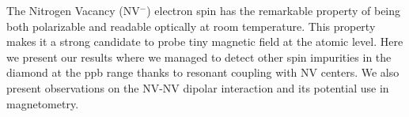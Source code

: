 \documentclass[aps]{revtex4-1}
\begin{document}
The Nitrogen Vacancy (NV$^-$) electron spin has the remarkable property of being both polarizable and readable optically at room temperature. This property makes it a strong candidate to probe tiny magnetic field at the atomic level. Here we present our results where we managed to detect other spin impurities in the diamond at the ppb range thanks to resonant coupling with NV centers. We also present observations on the NV-NV dipolar interaction and its potential use in magnetometry.
\end{document}
